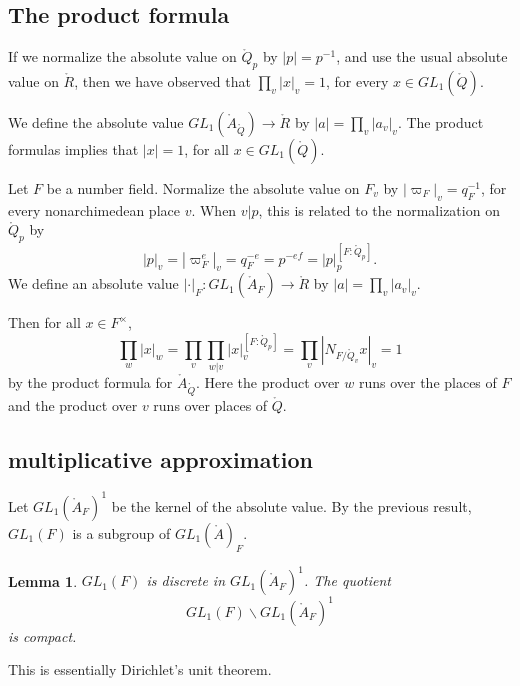 \documentclass{amsart}
\newtheorem{lemma}[equation]{Lemma}
\def\abs#1{{|#1|}}
\def\RR{\ring{R}}
\def\QQ{\ring{Q}}
\def\AA{\ring{A}}
\begin{document}
\subsection{The product formula}

If we normalize the absolute value on $\QQ_p$ by $\abs{p} = p^{-1}$,
and use the usual absolute value on $\RR$, then we have observed that
$\prod_v \abs{x}_v = 1$, for every $x\in GL_1(\QQ)$.

We define the absolute value $GL_1(\AA_\QQ)\to\RR$ by $\abs{a} =
\prod_v \abs{a_v}_v$.  The product formulas implies that $\abs{x}=1$,
for all $x\in GL_1(\QQ)$.

Let $F$ be a number field.  Normalize the absolute value on $F_v$ by
$\abs{\varpi_F}_v = q_F^{-1}$, for every nonarchimedean place $v$. 
When $v|p$, this is related to the normalization on $\QQ_p$
by
\[
\abs{p}_v = \abs{\varpi_F^e}_v = q_F^{-e} = p^{-e f} = \abs{p}_p^{[F:\QQ_p]}.
\]
We
define an absolute value $\abs{\cdot}_F:GL_1(\AA_F)\to \ring{R}$ by
$\abs{a}= \prod_v\abs{a_v}_v$.

Then for all $x\in F^\times$,
\[
\prod_w\abs{x}_w =  \prod_v \prod_ {w|v} \abs{x}_v^{[F:\QQ_p]} =
 \prod_v \abs{N_{F/\QQ_v} x}_v = 1
\]
by the product formula for $\AA_\QQ$.  Here the product over $w$ runs over
the places of $F$ and the product over $v$ runs over places of $\QQ$.


\subsection{multiplicative approximation}

Let $GL_1(\AA_F)^1$ be the kernel of the absolute value.  By the previous result,
$GL_1(F)$ is a subgroup of $GL_1(\AA)_F$.

\begin{lemma} $GL_1(F)$ is discrete in $GL_1(\AA_F)^1$.  The quotient 
\[
GL_1(F)\backslash GL_1(\AA_F)^1
\]
is 
compact.
\end{lemma}

This is essentially Dirichlet's unit theorem.
\end{document}
